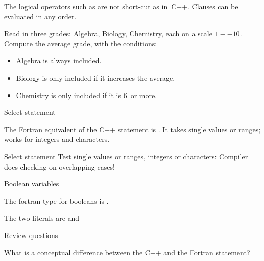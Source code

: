 The logical operators such as  are not short-cut as
in~C++. Clauses can be evaluated in any order.

\begin{exercise}
  Read in three grades: Algebra, Biology, Chemistry, each on a scale
  $1--10$. Compute the average grade, with the conditions:
  \begin{itemize}
  \item Algebra is always included.
  \item Biology is only included if it increases the average.
  \item Chemistry is only included if it is 6~or more.
  \end{itemize}
\end{exercise}

 {Select statement}

The Fortran equivalent of the C++  statement is . It takes
single values or ranges; works for integers and characters.

\begin{block}{Select statement}
  \label{sl:fswitch}
  Test single values or ranges, integers or characters:
  Compiler does checking on overlapping cases!
\end{block}

 {Boolean variables}

The fortran type for booleans is .

The two literals are  and 

 {Review questions}

\begin{exercise}
  \label{ex:select-vs-switch}
  What is a conceptual difference between the C++  and the
  Fortran  statement?
\end{exercise}
